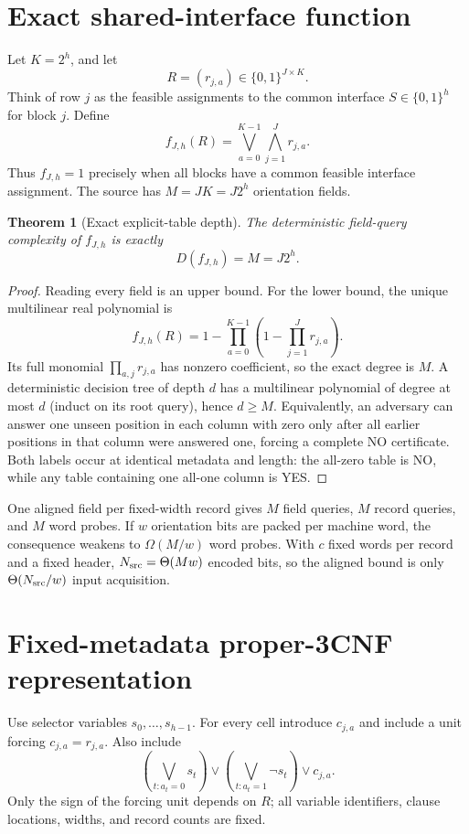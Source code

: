 \documentclass[11pt]{article}
\newtheorem{theorem}{Theorem}
\begin{document}
\section{Exact shared-interface function}

Let $K=2^h$, and let
\[
R=(r_{j,a})\in\{0,1\}^{J\times K}.
\]
Think of row $j$ as the feasible assignments to the common interface
$S\in\{0,1\}^h$ for block $j$.  Define
\[
f_{J,h}(R)=\bigvee_{a=0}^{K-1}\bigwedge_{j=1}^{J}r_{j,a}.
\]
Thus $f_{J,h}=1$ precisely when all blocks have a common feasible interface
assignment.  The source has $M=JK=J2^h$ orientation fields.

\begin{theorem}[Exact explicit-table depth]
The deterministic field-query complexity of $f_{J,h}$ is exactly
\[
D(f_{J,h})=M=J2^h.
\]
\end{theorem}
\begin{proof}
Reading every field is an upper bound.  For the lower bound, the unique
multilinear real polynomial is
\[
f_{J,h}(R)=1-\prod_{a=0}^{K-1}
\left(1-\prod_{j=1}^{J}r_{j,a}\right).
\]
Its full monomial $\prod_{a,j}r_{j,a}$ has nonzero coefficient, so the exact
degree is $M$.  A deterministic decision tree of depth $d$ has a multilinear
polynomial of degree at most $d$ (induct on its root query), hence $d\ge M$.
Equivalently, an adversary can answer one unseen position in each column
with zero only after all earlier positions in that column were answered one,
forcing a complete NO certificate.  Both labels occur at identical metadata
and length: the all-zero table is NO, while any table containing one all-one
column is YES.
\end{proof}

One aligned field per fixed-width record gives $M$ field queries, $M$ record
queries, and $M$ word probes.  If $w$ orientation bits are packed per machine
word, the consequence weakens to $\Omega(M/w)$ word probes.  With $c$ fixed
words per record and a fixed header, $N_{\rm src}=\Theta(Mw)$ encoded bits,
so the aligned bound is only $\Theta(N_{\rm src}/w)$ input acquisition.

\section{Fixed-metadata proper-3CNF representation}

Use selector variables $s_0,\ldots,s_{h-1}$.  For every cell introduce
$c_{j,a}$ and include a unit forcing $c_{j,a}=r_{j,a}$.  Also include
\[
\left(\bigvee_{t:a_t=0}s_t\right)\vee
\left(\bigvee_{t:a_t=1}\neg s_t\right)\vee c_{j,a}.
\tag{1}
\]
Only the sign of the forcing unit depends on $R$; all variable identifiers,
clause locations, widths, and record counts are fixed.
\end{document}
